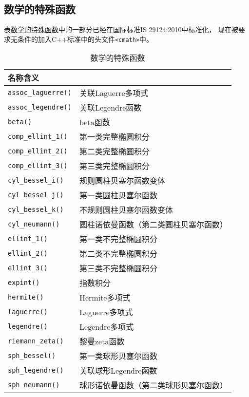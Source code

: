 \subsection{数学的特殊函数}
表\hyperref[t28.1]{数学的特殊函数}中的一部分已经在国际标准IS 29124:2010中标准化，
现在被要求无条件的加入C++标准中的头文件\texttt{<cmath>}中。
\begin{table}[ht]
    \centering
    \begin{tabular}{l|l}
        \hline
        \textbf{名称}\textbf{含义} \\
        \hline
        \texttt{assoc\_laguerre()} & 关联Laguerre多项式       \\
        \texttt{assoc\_legendre()} & 关联Legendre函数        \\
        \texttt{beta()}            & beta函数              \\
        \texttt{comp\_ellint\_1()} & 第一类完整椭圆积分           \\
        \texttt{comp\_ellint\_2()} & 第二类完整椭圆积分           \\
        \texttt{comp\_ellint\_3()} & 第三类完整椭圆积分           \\
        \texttt{cyl\_bessel\_i()}  & 规则圆柱贝塞尔函数变体         \\
        \texttt{cyl\_bessel\_j()}  & 第一类圆柱贝塞尔函数          \\
        \texttt{cyl\_bessel\_k()}  & 不规则圆柱贝塞尔函数变体        \\
        \texttt{cyl\_neumann()}    & 圆柱诺依曼函数（第二类圆柱贝塞尔函数） \\
        \texttt{ellint\_1()}       & 第一类不完整椭圆积分          \\
        \texttt{ellint\_2()}       & 第二类不完整椭圆积分          \\
        \texttt{ellint\_3()}       & 第三类不完整椭圆积分          \\
        \texttt{expint()}          & 指数积分                \\
        \texttt{hermite()}         & Hermite多项式          \\
        \texttt{laguerre()}        & Laguerre多项式         \\
        \texttt{legendre()}        & Legendre多项式         \\
        \texttt{riemann\_zeta()}   & 黎曼zeta函数            \\
        \texttt{sph\_bessel()}     & 第一类球形贝塞尔函数          \\
        \texttt{sph\_legendre()}   & 关联球形Legendre函数      \\
        \texttt{sph\_neumann()}    & 球形诺依曼函数（第二类球形贝塞尔函数） \\
        \hline
    \end{tabular}
    \caption{数学的特殊函数}
    \label{t28.1}
\end{table}

